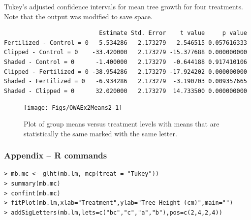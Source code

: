 \documentclass[10pt,openany]{book}\usepackage[]{graphicx}\usepackage[]{color}
\makeatletter
\newenvironment{kframe}{%
 \def\at@end@of@kframe{}%
 \ifinner\ifhmode%
  \def\at@end@of@kframe{\end{minipage}}%
  \begin{minipage}{\columnwidth}%
 \fi\fi%
 \def\FrameCommand##1{\hskip\@totalleftmargin \hskip-\fboxsep
 \colorbox{shadecolor}{##1}\hskip-\fboxsep
     \hskip-\linewidth \hskip-\@totalleftmargin \hskip\columnwidth}%
 \MakeFramed {\advance\hsize-\width
   \@totalleftmargin\z@ \linewidth\hsize
   \@setminipage}}%
 {\par\unskip\endMakeFramed%
 \at@end@of@kframe}
\newenvironment{knitrout}{}{} %
\makeatother
\begin{document}
\begin{table}[h]
  \centering
  \caption{Tukey's adjusted confidence intervals for mean tree growth for four treatments. Note that the output was modified to save space.}\label{tab:OWAEx2HSD}
\begin{knitrout}
\color{fgcolor}\begin{kframe}
\begin{verbatim}
                           Estimate Std. Error    t value     p value
Fertilized - Control = 0   5.534286   2.173279   2.546515 0.057616333
Clipped - Control = 0    -33.420000   2.173279 -15.377688 0.000000000
Shaded - Control = 0      -1.400000   2.173279  -0.644188 0.917410106
Clipped - Fertilized = 0 -38.954286   2.173279 -17.924202 0.000000000
Shaded - Fertilized = 0   -6.934286   2.173279  -3.190703 0.009357665
Shaded - Clipped = 0      32.020000   2.173279  14.733500 0.000000000
\end{verbatim}
\end{kframe}
\end{knitrout}
\end{table}

\begin{knitrout}
\color{fgcolor}\begin{figure}[hbtp]

{\centering \texttt{[image: Figs/OWAEx2Means2-1]} 

}

\caption[Plot of group means versus treatment levels with means that are statistically the same marked with the same letter]{Plot of group means versus treatment levels with means that are statistically the same marked with the same letter.}\label{fig:OWAEx2Means2}
\end{figure}


\end{knitrout}

\subsubsection*{Appendix -- R commands}
\begin{Verbatim}[formatcom=\color{red},xleftmargin=5mm,commandchars=\\\{\}]
> mb.mc <- glht(mb.lm, mcp(treat = "Tukey"))
> summary(mb.mc)
> confint(mb.mc)
> fitPlot(mb.lm,xlab="Treatment",ylab="Tree Height (cm)",main="")
> addSigLetters(mb.lm,lets=c("bc","c","a","b"),pos=c(2,4,2,4))
\end{Verbatim}
\end{document}
